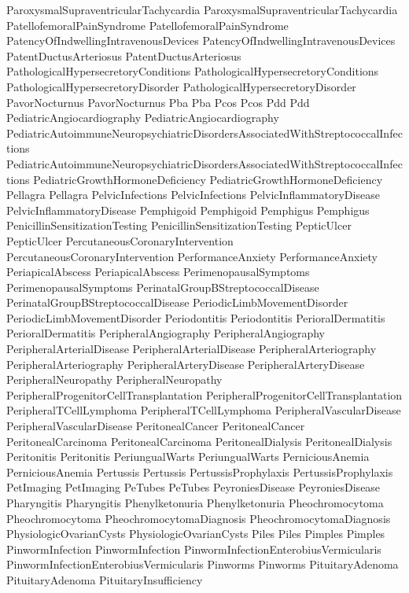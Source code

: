  ParoxysmalSupraventricularTachycardia
 ParoxysmalSupraventricularTachycardia
 PatellofemoralPainSyndrome
 PatellofemoralPainSyndrome
 PatencyOfIndwellingIntravenousDevices
 PatencyOfIndwellingIntravenousDevices
 PatentDuctusArteriosus
 PatentDuctusArteriosus
 PathologicalHypersecretoryConditions
 PathologicalHypersecretoryConditions
 PathologicalHypersecretoryDisorder
 PathologicalHypersecretoryDisorder
 PavorNocturnus
 PavorNocturnus
 Pba
 Pba
 Pcos
 Pcos
 Pdd
 Pdd
 PediatricAngiocardiography
 PediatricAngiocardiography
 PediatricAutoimmuneNeuropsychiatricDisordersAssociatedWithStreptococcalInfections
 PediatricAutoimmuneNeuropsychiatricDisordersAssociatedWithStreptococcalInfections
 PediatricGrowthHormoneDeficiency
 PediatricGrowthHormoneDeficiency
 Pellagra
 Pellagra
 PelvicInfections
 PelvicInfections
 PelvicInflammatoryDisease
 PelvicInflammatoryDisease
 Pemphigoid
 Pemphigoid
 Pemphigus
 Pemphigus
 PenicillinSensitizationTesting
 PenicillinSensitizationTesting
 PepticUlcer
 PepticUlcer
 PercutaneousCoronaryIntervention
 PercutaneousCoronaryIntervention
 PerformanceAnxiety
 PerformanceAnxiety
 PeriapicalAbscess
 PeriapicalAbscess
 PerimenopausalSymptoms
 PerimenopausalSymptoms
 PerinatalGroupBStreptococcalDisease
 PerinatalGroupBStreptococcalDisease
 PeriodicLimbMovementDisorder
 PeriodicLimbMovementDisorder
 Periodontitis
 Periodontitis
 PerioralDermatitis
 PerioralDermatitis
 PeripheralAngiography
 PeripheralAngiography
 PeripheralArterialDisease
 PeripheralArterialDisease
 PeripheralArteriography
 PeripheralArteriography
 PeripheralArteryDisease
 PeripheralArteryDisease
 PeripheralNeuropathy
 PeripheralNeuropathy
 PeripheralProgenitorCellTransplantation
 PeripheralProgenitorCellTransplantation
 PeripheralTCellLymphoma
 PeripheralTCellLymphoma
 PeripheralVascularDisease
 PeripheralVascularDisease
 PeritonealCancer
 PeritonealCancer
 PeritonealCarcinoma
 PeritonealCarcinoma
 PeritonealDialysis
 PeritonealDialysis
 Peritonitis
 Peritonitis
 PeriungualWarts
 PeriungualWarts
 PerniciousAnemia
 PerniciousAnemia
 Pertussis
 Pertussis
 PertussisProphylaxis
 PertussisProphylaxis
 PetImaging
 PetImaging
 PeTubes
 PeTubes
 PeyroniesDisease
 PeyroniesDisease
 Pharyngitis
 Pharyngitis
 Phenylketonuria
 Phenylketonuria
 Pheochromocytoma
 Pheochromocytoma
 PheochromocytomaDiagnosis
 PheochromocytomaDiagnosis
 PhysiologicOvarianCysts
 PhysiologicOvarianCysts
 Piles
 Piles
 Pimples
 Pimples
 PinwormInfection
 PinwormInfection
 PinwormInfectionEnterobiusVermicularis
 PinwormInfectionEnterobiusVermicularis
 Pinworms
 Pinworms
 PituitaryAdenoma
 PituitaryAdenoma
 PituitaryInsufficiency
